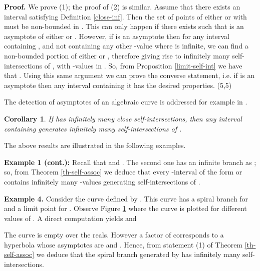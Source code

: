 \documentclass{elsart}
\def\qed{\hfill  \framebox(5,5){}}
\newtheorem{corollary}[theorem]{{\bf Corollary}}
\begin{document}
{\bf Proof.} We prove (1); the proof of (2) is similar. Assume that there exists an interval 
satisfying Definition \ref{close-inf}.
Then the set of points of either  or  with  must be non-bounded in .
This can only happen if there exists  such that  is an asymptote of either  or . However, if 
is an asymptote then for any interval  containing , and not containing any other -value where  is infinite, we can find
a non-bounded portion of either  or , therefore giving rise to infinitely many self-intersections of ,
with -values in . So, from Proposition \ref{limit-self-int} we have that . Using this same argument we can prove the converse
statement, i.e. if  is an asymptote then any interval containing it has the desired properties. \qed

The detection of asymptotes of an algebraic curve is addressed for example in \cite{Zeng}.

\begin{corollary} \label{corol-self-assoc}
If  has infinitely many close self-intersections, then any interval containing  generates infinitely many self-intersections
of .
\end{corollary}

The above results are illustrated in the following examples.

{\bf Example 1 (cont.):} Recall that  and . The second one has an infinite
branch  as ; so, from Theorem \ref{th-self-assoc} we deduce that every -interval of the form  or 
contains infinitely many -values generating self-intersections of .

{\bf Example 4.} Consider the curve defined by . This
curve has a spiral branch for  and a limit point for . Observe
Figure \ref{la7} where the curve is plotted for different values of . A direct computation yields  and




The curve  is
empty over the reals. However a factor of  corresponds to a hyperbola whose asymptotes are  and . Hence, from
statement (1) of Theorem \ref{th-self-assoc} we deduce that the spiral branch
generated by  has infinitely many self-intersections.



\begin{figure}[ht]
\begin{center}
\centerline{}
\end{center}
\caption{ }\label{la7}
\end{figure}
\end{document}
